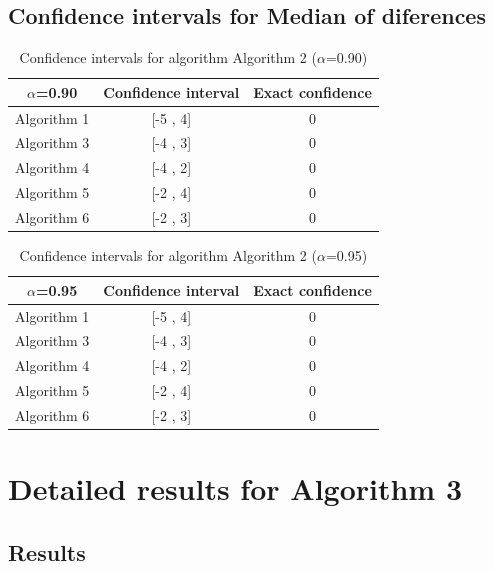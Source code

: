 \documentclass[a4paper,10pt]{article}
\begin{document}
\subsection{Confidence intervals for Median of diferences}

\begin{table}[!htp]
\centering\small
\begin{tabular}{
|c|c|c|}
\hline
 $\alpha$=0.90 & Confidence interval & Exact confidence \\ \hline 
Algorithm 1 & [-5 , 4] & 0\\ \hline 
Algorithm 3 & [-4 , 3] & 0\\ \hline 
Algorithm 4 & [-4 , 2] & 0\\ \hline 
Algorithm 5 & [-2 , 4] & 0\\ \hline 
Algorithm 6 & [-2 , 3] & 0\\ \hline 

\end{tabular}
\caption{Confidence intervals for algorithm Algorithm 2 ($\alpha$=0.90)}
\end{table}
\begin{table}[!htp]
\centering\small
\begin{tabular}{
|c|c|c|}
\hline
 $\alpha$=0.95 & Confidence interval & Exact confidence \\ \hline 
Algorithm 1 & [-5 , 4] & 0\\ \hline 
Algorithm 3 & [-4 , 3] & 0\\ \hline 
Algorithm 4 & [-4 , 2] & 0\\ \hline 
Algorithm 5 & [-2 , 4] & 0\\ \hline 
Algorithm 6 & [-2 , 3] & 0\\ \hline 

\end{tabular}
\caption{Confidence intervals for algorithm Algorithm 2 ($\alpha$=0.95)}
\end{table}

 \clearpage 


\section{Detailed results for Algorithm 3}


\subsection{Results}
\end{document}
